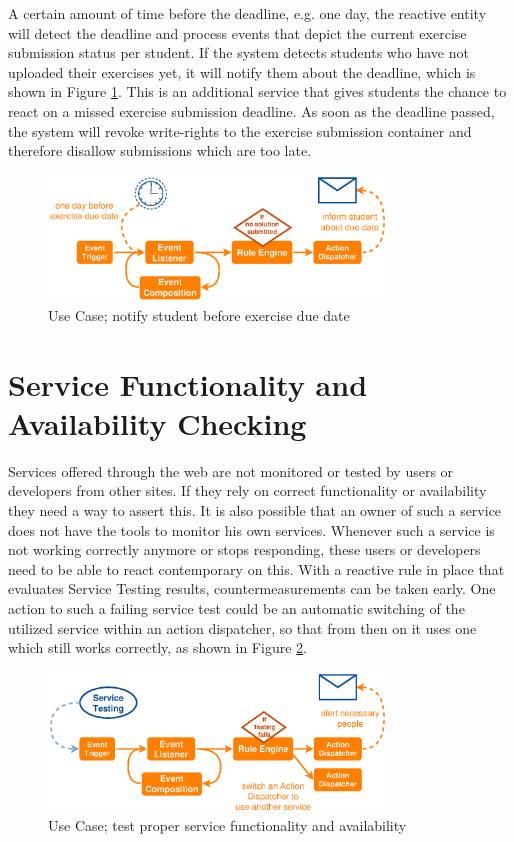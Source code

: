 A certain amount of time before the deadline, e.g. one day, the reactive entity will detect the deadline and process events that depict the current exercise submission status per student.
If the system detects students who have not uploaded their exercises yet, it will notify them about the deadline, which is shown in Figure \ref{fig:ProBinderExerciseNotification}.
This is an additional service that gives students the chance to react on a missed exercise submission deadline.
As soon as the deadline passed, the system will revoke write-rights to the exercise submission container and therefore disallow submissions which are too late.
\begin{figure}[!ht]
  \centering
  \includegraphics[width=0.8\textwidth]{figures/ProBinderExerciseNotification}
  \caption{Use Case; notify student before exercise due date}
  \label{fig:ProBinderExerciseNotification}
\end{figure}



\section{Service Functionality and Availability Checking}
Services offered through the \textrm{\gls{web}} are not monitored or tested by users or developers from other sites.
If they rely on correct functionality or availability they need a way to assert this.
It is also possible that an owner of such a service does not have the tools to monitor his own services.
Whenever such a service is not working correctly anymore or stops responding, these users or developers need to be able to react contemporary on this.
With a reactive rule in place that evaluates Service Testing results, countermeasurements can be taken early.
One action to such a failing service test could be an automatic switching of the utilized service within an action dispatcher, so that from then on it uses one which still works correctly, as shown in Figure \ref{fig:ProBinderServiceTesting}.
\begin{figure}[!ht]
  \centering
  \includegraphics[width=0.8\textwidth]{figures/ProBinderServiceTesting}
  \caption{Use Case; test proper service functionality and availability}
  \label{fig:ProBinderServiceTesting}
\end{figure}



